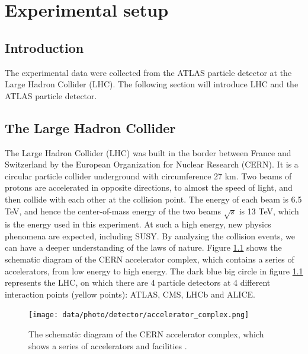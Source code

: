 \chapter{Experimental setup}
\label{ch:detector}

\section{Introduction}
\label{sec:detector_introduction}

The experimental data were collected from the ATLAS particle detector at the Large Hadron Collider (LHC).
The following section will introduce LHC and the ATLAS particle detector.

\section{The Large Hadron Collider}
\label{sec:detector_LHC}

The Large Hadron Collider (LHC) was built in the border between France and Switzerland by the European Organization for Nuclear Research (CERN).
It is a circular particle collider underground with circumference 27 km.
Two beams of protons are accelerated in opposite directions, to almost the speed of light, and then collide with each other at the collision point.
The energy of each beam is 6.5 TeV, and hence the center-of-mass energy of the two beams $\sqrt{s}$ is 13 TeV, which is the energy used in this experiment.
At such a high energy, new physics phenomena are expected, including SUSY.
By analyzing the collision events, we can have a deeper understanding of the laws of nature.
Figure \ref{fig:detector_LHC_accelerator_complex} shows the schematic diagram of the CERN accelerator complex, which contains a series of accelerators, from low energy to high energy.
The dark blue big circle in figure \ref{fig:detector_LHC_accelerator_complex} represents the LHC, on which there are 4 particle detectors at 4 different interaction points (yellow points): ATLAS, CMS, LHCb and ALICE.

\begin{figure}
\centering
\texttt{[image: data/photo/detector/accelerator\_complex.png]}
\caption{The schematic diagram of the CERN accelerator complex, which shows a series of accelerators and facilities \cite{complex}.}
\label{fig:detector_LHC_accelerator_complex}
\end{figure}

